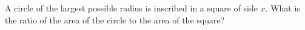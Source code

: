 A circle of the largest possible radius is inscribed in a square of side $x$. What is the ratio of the area of the circle to the area of the square?
